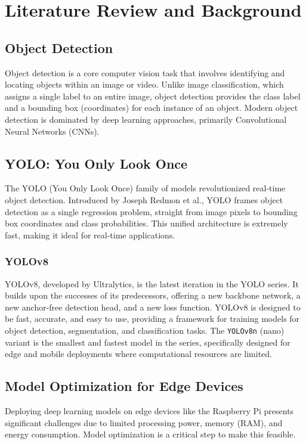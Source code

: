 \chapter{Literature Review and Background}
\section{Object Detection}
Object detection is a core computer vision task that involves identifying and locating objects within an image or video. Unlike image classification, which assigns a single label to an entire image, object detection provides the class label and a bounding box (coordinates) for each instance of an object. Modern object detection is dominated by deep learning approaches, primarily Convolutional Neural Networks (CNNs).

\section{YOLO: You Only Look Once}
The YOLO (You Only Look Once) family of models revolutionized real-time object detection. Introduced by Joseph Redmon et al., YOLO frames object detection as a single regression problem, straight from image pixels to bounding box coordinates and class probabilities. This unified architecture is extremely fast, making it ideal for real-time applications.

\subsection{YOLOv8}
YOLOv8, developed by Ultralytics, is the latest iteration in the YOLO series. It builds upon the successes of its predecessors, offering a new backbone network, a new anchor-free detection head, and a new loss function. YOLOv8 is designed to be fast, accurate, and easy to use, providing a framework for training models for object detection, segmentation, and classification tasks. The \texttt{YOLOv8n} (nano) variant is the smallest and fastest model in the series, specifically designed for edge and mobile deployments where computational resources are limited.

\section{Model Optimization for Edge Devices}
Deploying deep learning models on edge devices like the Raspberry Pi presents significant challenges due to limited processing power, memory (RAM), and energy consumption. Model optimization is a critical step to make this feasible.

